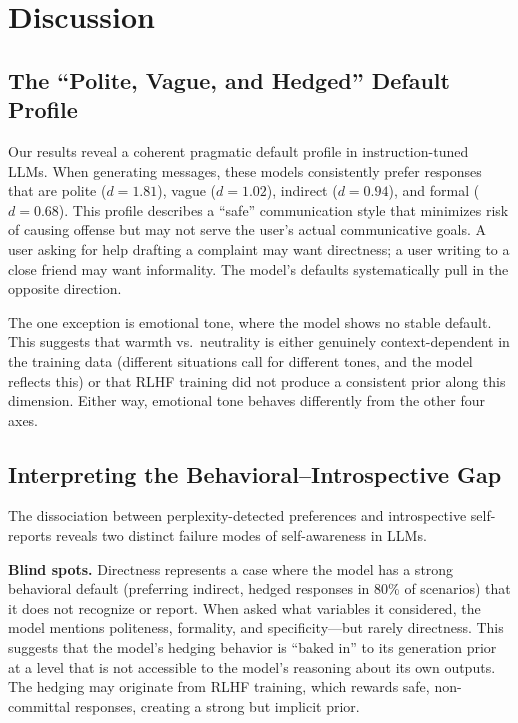 \section{Discussion}
\label{sec:discussion}

\subsection{The ``Polite, Vague, and Hedged'' Default Profile}
\label{sec:profile}

Our results reveal a coherent pragmatic default profile in instruction-tuned LLMs. When generating messages, these models consistently prefer responses that are polite ($d{=}1.81$), vague ($d{=}1.02$), indirect ($d{=}0.94$), and formal ($d{=}0.68$). This profile describes a ``safe'' communication style that minimizes risk of causing offense but may not serve the user's actual communicative goals. A user asking for help drafting a complaint may want directness; a user writing to a close friend may want informality. The model's defaults systematically pull in the opposite direction.

The one exception is emotional tone, where the model shows no stable default. This suggests that warmth vs.\ neutrality is either genuinely context-dependent in the training data (different situations call for different tones, and the model reflects this) or that RLHF training did not produce a consistent prior along this dimension. Either way, emotional tone behaves differently from the other four axes.

\subsection{Interpreting the Behavioral--Introspective Gap}
\label{sec:gap}

The dissociation between perplexity-detected preferences and introspective self-reports reveals two distinct failure modes of self-awareness in LLMs.

{\bf Blind spots.} Directness represents a case where the model has a strong behavioral default (preferring indirect, hedged responses in 80\% of scenarios) that it does not recognize or report. When asked what variables it considered, the model mentions politeness, formality, and specificity---but rarely directness. This suggests that the model's hedging behavior is ``baked in'' to its generation prior at a level that is not accessible to the model's reasoning about its own outputs. The hedging may originate from RLHF training, which rewards safe, non-committal responses, creating a strong but implicit prior.

